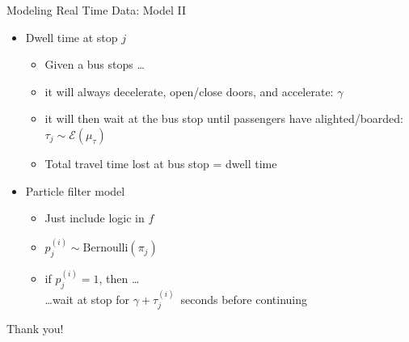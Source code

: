 \documentclass[10pt,t]{beamer}
\begin{document}
\begin{frame}{Modeling Real Time Data: Model II}
  \onslide<+->
  \begin{itemize}[<+- | alert@+>]
    \item Dwell time at stop $j$
      \begin{itemize}
        \item Given a bus stops \ldots
        \item it will always decelerate,
          open/close doors, and accelerate: $\gamma$
        \item it will then wait at the bus stop until passengers
          have alighted/boarded: $\tau_j \sim \mathcal{E}(\mu_\tau)$
        \item Total travel time lost at bus stop = dwell time
      \end{itemize}

    \item Particle filter model
      \begin{itemize}
        \item Just include logic in $f$
        \item $p_j^{(i)} \sim \text{Bernoulli}(\pi_j)$
        \item if $p_j^{(i)} = 1$, then \ldots\\
          \ldots wait at stop for $\gamma + \tau_j^{(i)}$~seconds before continuing
      \end{itemize}
  \end{itemize}
  \onslide<+->
\end{frame}


\begin{frame}[standout]
  Thank you!
\end{frame}
\end{document}
